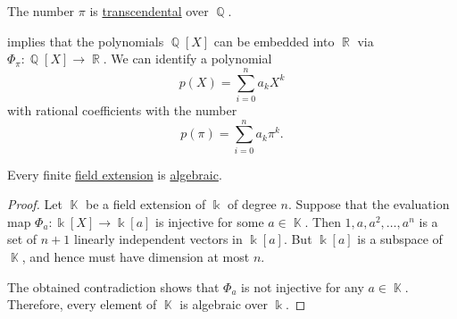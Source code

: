 \begin{theorem}[Pi is transcendental]\label{thm:pi_is_transcendental}
  The number \hyperref[def:pi]{\( \pi \)} is \hyperref[def:transcendetal_element]{transcendental} over \( \BbbQ \).
\end{theorem}

\begin{example}\label{ex:polynomials_over_pi}
   implies that the polynomials \( \BbbQ[X] \) can be embedded into \( \BbbR \) via \( \Phi_\pi: \BbbQ[X] \to \BbbR \). We can identify a polynomial
  \begin{equation*}
    p(X) = \sum_{i=0}^n a_k X^k
  \end{equation*}
  with rational coefficients with the number
  \begin{equation*}
    p(\pi) = \sum_{i=0}^n a_k \pi^k.
  \end{equation*}
\end{example}

\begin{lemma}\label{thm:finite_field_extensions_are_algebraic}
  Every finite \hyperref[def:field_extension]{field extension} is \hyperref[def:transcendetal_element]{algebraic}.
\end{lemma}
\begin{proof}
  Let \( \BbbK \) be a field extension of \( \Bbbk \) of degree \( n \). Suppose that the evaluation map \( \Phi_a: \Bbbk[X] \to \Bbbk[a] \) is injective for some \( a \in \BbbK \). Then \( 1, a, a^2, \ldots, a^n \) is a set of \( n + 1 \) linearly independent vectors in \( \Bbbk[a] \). But \( \Bbbk[a] \) is a subspace of \( \BbbK \), and hence must have dimension at most \( n \).

  The obtained contradiction shows that \( \Phi_a \) is not injective for any \( a \in \BbbK \). Therefore, every element of \( \BbbK \) is algebraic over \( \Bbbk \).
\end{proof}

